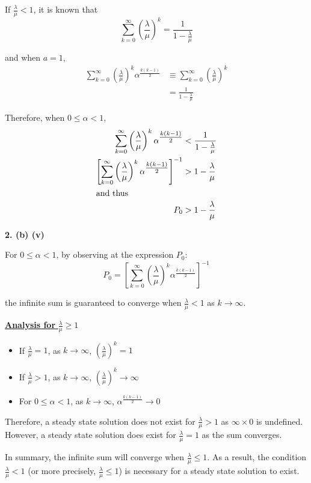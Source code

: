 \documentclass[12pt, a4paper]{article}
\begin{document}
\noindent If \(\displaystyle\frac{\lambda}{\mu} < 1\), it is known that
\[\sum_{k=0}^{\infty} \left(\frac{\lambda}{\mu}\right)^k = \frac{1}{1 - \frac{\lambda}{\mu}} \]

\noindent and when \(a = 1\),
\begin{align*}
  \sum_{k=0}^{\infty} \left(\frac{\lambda}{\mu}\right)^k\alpha^{\textstyle\frac{k(k-1)}{2}} &\equiv \sum_{k=0}^{\infty} \left(\frac{\lambda}{\mu}\right)^k \\[1.5ex]
  &= \frac{1}{1 - \frac{\lambda}{\mu}}
\end{align*}

\noindent Therefore, when \(0 \leq \alpha < 1\),
\begin{align*}
  \sum_{k=0}^{\infty} \left(\frac{\lambda}{\mu}\right)^k\alpha^{\textstyle\frac{k(k-1)}{2}} &< \frac{1}{1 - \frac{\lambda}{\mu}} \\
  \left[\sum_{k=0}^{\infty} \left(\frac{\lambda}{\mu}\right)^k\alpha^{\textstyle\frac{k(k-1)}{2}}\right]^{-1} &> 1 - \frac{\lambda}{\mu} \\
\intertext{and thus}
  P_0 &> 1 - \frac{\lambda}{\mu}
\end{align*}

\newpage
\noindent\textbf{2. (b) (v)}

\noindent For \(0 \leq \alpha < 1\), by observing at the expression \(P_0\):
\[P_0 = \left[\sum_{k=0}^{\infty} \left(\frac{\lambda}{\mu}\right)^k\alpha^{\textstyle\frac{k(k-1)}{2}}\right]^{-1}\]

\noindent the infinite sum is guaranteed to converge when \(\displaystyle\frac{\lambda}{\mu} < 1\) as \(k \rightarrow \infty\).

\noindent \underline{\textbf{Analysis for }\(\displaystyle\frac{\lambda}{\mu} \geq 1\)}
\begin{itemize}
  \item If \(\displaystyle\frac{\lambda}{\mu} = 1\), as \(k \rightarrow \infty\), \(\displaystyle\left(\frac{\lambda}{\mu}\right)^k = 1\)
  \item If \(\displaystyle\frac{\lambda}{\mu} > 1\), as \(k \rightarrow \infty\), \(\displaystyle\left(\frac{\lambda}{\mu}\right)^k \rightarrow \infty\)
  \item For \(0 \leq \alpha < 1\), as \(k \rightarrow \infty\), \(\alpha^{\textstyle\frac{k(k-1)}{2}} \rightarrow 0\)
\end{itemize}

\noindent Therefore, a steady state solution does not exist for \(\displaystyle\frac{\lambda}{\mu} > 1\) as \(\infty \times 0\) is undefined. However, a steady state solution does exist for \(\displaystyle\frac{\lambda}{\mu} = 1\) as the sum converges.

In summary, the infinite sum will converge when \(\displaystyle\frac{\lambda}{\mu} \leq 1\). As a result, the condition \(\displaystyle\frac{\lambda}{\mu} < 1\) (or more precisely, \(\displaystyle\frac{\lambda}{\mu} \leq 1\)) is necessary for a steady state solution to exist.
\end{document}
